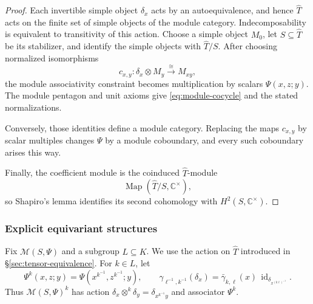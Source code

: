 \documentclass{amsart}
\theoremstyle{definition}
\newcommand{\id}{\operatorname{id}}
\newcommand{\Map}{\operatorname{Map}}
\newcommand{\M}{\mathscr{M}}
\newcommand{\Ctimes}{\mathbb{C}^{\times}}
\numberwithin{equation}{section}
\begin{document}
\begin{proof}
Each invertible simple object $\delta_x$ acts by an autoequivalence, and hence $\widehat{T}$
acts on the finite set of simple objects of the module category.  Indecomposability
is equivalent to transitivity of this action.  Choose a simple object $M_0$, let
$S\subseteq \widehat{T}$ be its stabilizer, and identify the simple objects with $\widehat{T}/S$.
After choosing normalized isomorphisms
\[
 c_{x,y}:\delta_x\otimes M_y\xrightarrow{\cong}M_{xy},
\]
the module associativity constraint becomes multiplication by scalars
$\Psi(x,z;y)$.  The module pentagon and unit axioms give
\eqref{eq:module-cocycle} and the stated normalizations.  

Conversely, those
identities define a module category.  Replacing the maps $c_{x,y}$ by scalar
multiples changes $\Psi$ by a module coboundary, and every such coboundary arises
this way.  

Finally, the coefficient module is the coinduced $\widehat{T}$-module
$$\Map(\widehat{T}/S,\Ctimes),$$
so Shapiro's lemma identifies its second cohomology with
$H^2(S,\Ctimes)$.
\end{proof}

\subsubsection{Explicit equivariant structures}\label{sec:explicit-equivariant-data}

Fix $\M(S,\Psi)$ and a subgroup $L\subseteq K$.  We use the action on $\widehat{T}$ introduced in
\S\ref{sec:tensor-equivalence}.  For $k\in L$, let
\[
 \Psi^k(x,z;y)=\Psi(x^{k^{-1}},z^{k^{-1}};y),
 \qquad
 \gamma_{\ell^{-1},k^{-1}}(\delta_x)
 =\bar\gamma_{k,\ell}(x)\,\id_{\delta_{x^{(k\ell)^{-1}}}}.
\]
Thus $\M(S,\Psi)^k$ has action
$\delta_x\otimes^k\delta_y=\delta_{x^{k^{-1}}y}$ and associator $\Psi^k$.
\end{document}
